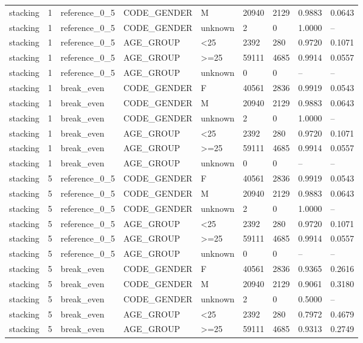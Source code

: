 \begin{longtable}{lllllllll}
stacking & 1 & reference\_0\_5 & CODE\_GENDER & M & 20940 & 2129 & 0.9883 & 0.0643 \\
stacking & 1 & reference\_0\_5 & CODE\_GENDER & unknown & 2 & 0 & 1.0000 & -- \\
stacking & 1 & reference\_0\_5 & AGE\_GROUP & <25 & 2392 & 280 & 0.9720 & 0.1071 \\
stacking & 1 & reference\_0\_5 & AGE\_GROUP & >=25 & 59111 & 4685 & 0.9914 & 0.0557 \\
stacking & 1 & reference\_0\_5 & AGE\_GROUP & unknown & 0 & 0 & -- & -- \\
stacking & 1 & break\_even & CODE\_GENDER & F & 40561 & 2836 & 0.9919 & 0.0543 \\
stacking & 1 & break\_even & CODE\_GENDER & M & 20940 & 2129 & 0.9883 & 0.0643 \\
stacking & 1 & break\_even & CODE\_GENDER & unknown & 2 & 0 & 1.0000 & -- \\
stacking & 1 & break\_even & AGE\_GROUP & <25 & 2392 & 280 & 0.9720 & 0.1071 \\
stacking & 1 & break\_even & AGE\_GROUP & >=25 & 59111 & 4685 & 0.9914 & 0.0557 \\
stacking & 1 & break\_even & AGE\_GROUP & unknown & 0 & 0 & -- & -- \\
stacking & 5 & reference\_0\_5 & CODE\_GENDER & F & 40561 & 2836 & 0.9919 & 0.0543 \\
stacking & 5 & reference\_0\_5 & CODE\_GENDER & M & 20940 & 2129 & 0.9883 & 0.0643 \\
stacking & 5 & reference\_0\_5 & CODE\_GENDER & unknown & 2 & 0 & 1.0000 & -- \\
stacking & 5 & reference\_0\_5 & AGE\_GROUP & <25 & 2392 & 280 & 0.9720 & 0.1071 \\
stacking & 5 & reference\_0\_5 & AGE\_GROUP & >=25 & 59111 & 4685 & 0.9914 & 0.0557 \\
stacking & 5 & reference\_0\_5 & AGE\_GROUP & unknown & 0 & 0 & -- & -- \\
stacking & 5 & break\_even & CODE\_GENDER & F & 40561 & 2836 & 0.9365 & 0.2616 \\
stacking & 5 & break\_even & CODE\_GENDER & M & 20940 & 2129 & 0.9061 & 0.3180 \\
stacking & 5 & break\_even & CODE\_GENDER & unknown & 2 & 0 & 0.5000 & -- \\
stacking & 5 & break\_even & AGE\_GROUP & <25 & 2392 & 280 & 0.7972 & 0.4679 \\
stacking & 5 & break\_even & AGE\_GROUP & >=25 & 59111 & 4685 & 0.9313 & 0.2749 \\

\end{longtable}
